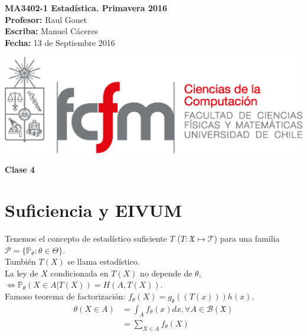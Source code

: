 \documentclass[10pt]{article}
\theoremstyle{plain}
\theoremstyle{definition}
\newcommand{\catnum}{4} %
\newcommand{\fecha}{13 de Septiembre 2016 }
\begin{document}
\vspace*{-1.2 cm}
\begin{minipage}{0.6\textwidth}
\begin{flushleft}
\hspace*{-0.5cm}\textbf{MA3402-1 Estadística. Primavera 2016}\\
\hspace*{-0.5cm}\textbf{Profesor:} Raul Gouet\\
\hspace*{-0.5cm}\textbf{Escriba:} Manuel Cáceres\\
\hspace*{-0.5cm}\textbf{Fecha:} \fecha
\end{flushleft}
\end{minipage}
\begin{minipage}{0.36\textwidth}
\begin{flushright}
\includegraphics[scale=0.3]{imagenes/fcfm_dcc}
\end{flushright}
\end{minipage}
\bigskip

\begin{center}
\LARGE\textbf{Clase \catnum}
\end{center}

\section{Suficiencia y EIVUM}
Tenemos el concepto de estadístico suficiente $T$ ($T\colon \mathfrak{X} \mapsto \mathcal{T}$) para una familia $\mathcal{P}=\{\mathbb{P}_{\theta}\colon \theta \in \Theta\}$.\\
También $T(X)$ se llama estadístico.\\
La ley de $X$ condicionada en $T(X)$ no depende de $\theta$, $\Leftrightarrow \mathbb{P}_{\theta}(X \in A|T(X)) = H(A,T(X))$.\\
Famoso teorema de factorización: $f_{\theta}(X) = g_{\theta}((T(x)))h(x)$.\\
\begin{align*}
\mathbb{\theta}(X\in A) &= \int_{A}f_{\theta}(x)dx, \forall A \in \mathcal{B}(\mathfrak{X})\\
&= \sum_{X\in A}f_{\theta}(X)
\end{align*}
\end{document}
